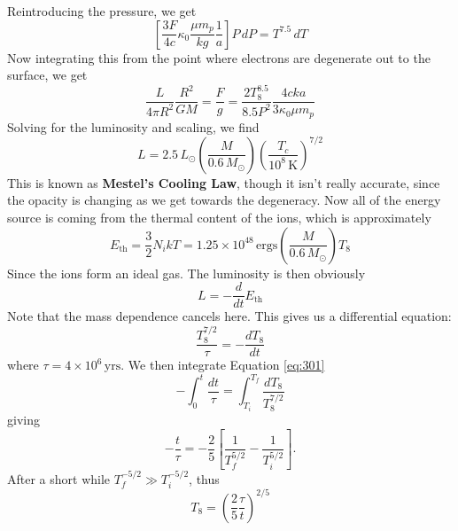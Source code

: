 \documentclass[10pt]{article}
\numberwithin{equation}{section}
\begin{document}
    Reintroducing the pressure, we get
    \begin{equation}
      \label{eq:296}
      \left[\frac{3F}{4c}\kappa_0\frac{\mu m_p}{k g}\frac{1}{a}\right]P
\,dP=T^{7.5}\,dT
    \end{equation}
    Now integrating this from the point where electrons are degenerate
    out to the surface, we get
    \begin{equation}
      \label{eq:297}
      \frac{L}{4\pi R^2}\frac{R^2}{GM}=\frac{F}{g}=\frac{2
        T_8^{8.5}}{8.5 P^2}\frac{4c k a}{3 \kappa_0 \mu m_p}
    \end{equation}
    Solving for the luminosity and scaling, we find
    \begin{equation}
      \label{eq:298}
      \boxed{L=2.5\,L_\odot \left(\frac{M}{0.6\,M_\odot
          }\right)\left(\frac{T_c}{10^8 \,\mathrm{K}}\right)^{7/2}}
    \end{equation}
    This is known as \textbf{Mestel's Cooling Law}, though it isn't
    really accurate, since the opacity is changing as we get towards
    the degeneracy. Now all of the energy source is coming from the
    thermal content of the ions, which is approximately
    \begin{equation}
      \label{eq:299}
      E_{\mathrm{th}}=\frac{3}{2}N_i k T=1.25\times 10^{48}\,\mathrm{ergs}
\left(\frac{M}{0.6\,M_\odot}\right)T_8
    \end{equation}
    Since the ions form an ideal gas. The luminosity is then obviously
    \begin{equation}
      \label{eq:300}
      L=-\frac{d}{dt}E_{\mathrm{th}}
    \end{equation}
    Note that the mass dependence cancels here. This gives us a
    differential equation:
    \begin{equation}
      \label{eq:301}
      \frac{T_8^{7/2}}{\tau}=-\frac{dT_8}{dt}
    \end{equation}
    where $\tau=4\times 10^{6}\,\mathrm{yrs}$.
    We then integrate Equation \ref{eq:301}
    \begin{equation}
     -\int_0^t \dfrac{dt}{\tau} = \int_{T_i}^{T_f} \dfrac{dT_8}{T_8^{7/2}}
    \end{equation}
    giving
    \begin{equation}
     -\dfrac{t}{\tau}=-\dfrac{2}{5}\left[ \dfrac{1}{T_f^{5/2}}-\dfrac{1}{T_i^{5/2}} \right].
    \end{equation}    
    After a short while $T_f^{-5/2} \gg T_i^{-5/2}$, thus
    \begin{equation}
      \label{eq:302}
      T_8=\left(\frac{2}{5}\frac{\tau}{t}\right)^{2/5}
    \end{equation}
\end{document}
